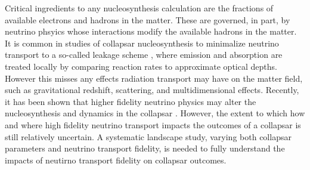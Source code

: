 \documentclass[12pt]{article}
\begin{document}
Critical ingredients to any nucleosynthesis calculation are the fractions of available electrons and hadrons in the matter.
These are governed, in part, by neutrino phsyics whose interactions modify the available hadrons in the matter.
It is common in studies of collapsar nucleosynthesis to minimalize neutrino transport to a so-called leakage scheme \citep{siegel:2019},
where emission and absorption are treated locally by comparing reaction rates to approximate optical depths.
However this misses any effects radiation transport may have on the matter field, such as gravitational redshift, scattering, and multidimensional effects.
Recently, it has been shown that higher fidelity neutrino physics may alter the nucleosynthesis and dynamics in the collapsar \citep{miller:2020}.
However, the extent to which how and where high fidelity neutrino transport impacts the outcomes of a collapsar is still relatively uncertain.
A systematic landscape study, varying both collapsar parameters and neutrino transport fidelity, is needed to fully understand the impacts of neutirno transport fidelity on collapsar outcomes.

\end{document}
